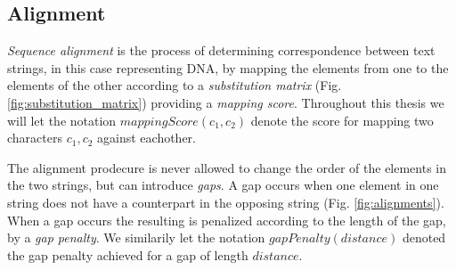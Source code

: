 \documentclass[thesis.tex]{subfiles}
\begin{document}
\subsection{Alignment}
\textit{Sequence alignment} is the process of determining correspondence between text strings, in this case representing DNA, by mapping the elements from one to the elements of the other according to a \textit{substitution matrix} (Fig. \ref{fig:substitution_matrix}) providing a \textit{mapping score}. Throughout this thesis we will let the notation $mappingScore(c_1,c_2)$ denote the score for mapping two characters $c_1, c_2$ against eachother.\\
\par\noindent
The alignment prodecure is never allowed to change the order of the elements in the two strings, but can introduce \textit{gaps}. A gap occurs when one element in one string does not have a counterpart in the opposing string (Fig. \ref{fig:alignments}). When a gap occurs the resulting is penalized according to the length of the gap, by a \textit{gap penalty}. We similarily let the notation $gapPenalty(distance)$ denoted the gap penalty achieved for a gap of length $distance$.
\end{document}
